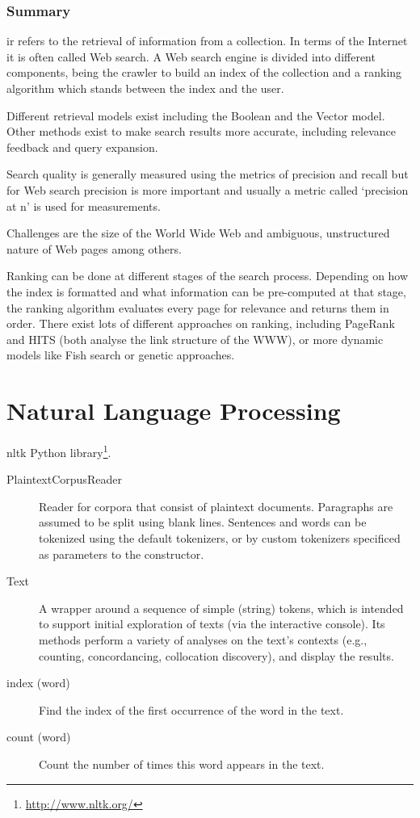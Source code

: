 \subsubsection*{Summary}

\gls{ir} refers to the retrieval of information from a collection. In terms of the Internet it is often called Web search. A Web search engine is divided into different components, being the crawler to build an index of the collection and a ranking algorithm which stands between the index and the user.

Different retrieval models exist including the Boolean and the Vector model. Other methods exist to make search results more accurate, including relevance feedback and query expansion.

Search quality is generally measured using the metrics of precision and recall but for Web search precision is more important and usually a metric called `precision at n' is used for measurements.

Challenges are the size of the World Wide Web and ambiguous, unstructured nature of Web pages among others.

Ranking can be done at different stages of the search process. Depending on how the index is formatted and what information can be pre-computed at that stage, the ranking algorithm evaluates every page for relevance and returns them in order. There exist lots of different approaches on ranking, including PageRank and HITS (both analyse the link structure of the WWW), or more dynamic models like Fish search or genetic approaches.


\section{Natural Language Processing}

\gls{nltk} Python library\footnote{\url{http://www.nltk.org/}}.

\begin{description}
  \item [PlaintextCorpusReader] Reader for corpora that consist of plaintext documents. Paragraphs are assumed to be split using blank lines. Sentences and words can be tokenized using the default tokenizers, or by custom tokenizers specificed as parameters to the constructor.
  \item [Text] A wrapper around a sequence of simple (string) tokens, which is intended to support initial exploration of texts (via the interactive console). Its methods perform a variety of analyses on the text’s contexts (e.g., counting, concordancing, collocation discovery), and display the results.
  \item [index (word)] Find the index of the first occurrence of the word in the text.
  \item [count (word)] Count the number of times this word appears in the text.
\end{description}


